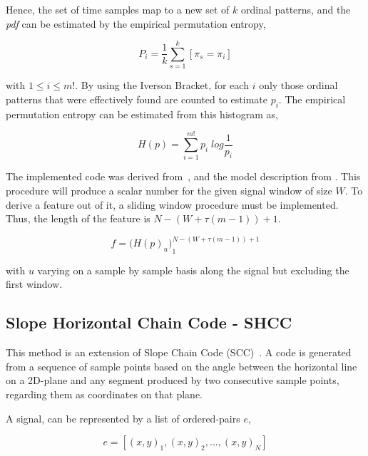 \documentclass[brainsci,article,submit,moreauthors,pdftex,10pt,a4paper]{mdpi}
\begin{document}
Hence, the set of time samples map to a new set of $k$ ordinal patterns, and the \textit{pdf} can be estimated by the empirical permutation entropy,

\begin{equation}
P_i = \frac{1}{k} \sum_{s=1}^{k} \left[ \pi_{s} = \pi_{i} \right]
\label{eq:pesignal}
\end{equation}

\noindent with $1 \leq i \leq m!$.  By using the Iverson Bracket, for each $i$ only those ordinal patterns that were effectively found are counted to estimate $p_i$.  The empirical permutation entropy can be estimated from this histogram as,

\begin{equation}
H(p) = \sum_{i=1}^{m!} p_{i} \; log \frac{1}{p_{i}}
\label{eq:pesignal}
\end{equation}

The implemented code was derived from~\citep{Unakafova2013}, and the model description from \citep{Berger2017}.  This procedure will produce a scalar number for the given signal window of size $W$.  To derive a feature out of it, a sliding window procedure must be implemented.  Thus, the length of the feature is $N - (W + \tau (m - 1)) + 1$.

\begin{equation}
f =  {\bigg ( H(p)_{u} \bigg )}_{1}^{N - (W + \tau (m - 1)) + 1}
\label{eq:multiclassificationrow}
\end{equation}

\noindent with $u$ varying on a sample by sample basis along the signal but excluding the first window.

\subsection{Slope Horizontal Chain Code - SHCC}

This method is an extension of Slope Chain Code (SCC)~\citep{Alvarado-Gonzalez2016}. A code is generated from a sequence of sample points based on the angle between the horizontal line on a 2D-plane and any segment produced by two consecutive sample points, regarding them as coordinates on that plane.  

A signal, can be represented by a list of ordered-pairs $e$,

\begin{equation}
e = \left[ (x,y)_{1}, (x,y)_{2}, ..., (x,y)_{N} \right]
\label{eq:shccdelta}
\end{equation}
\end{document}
